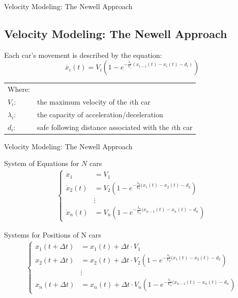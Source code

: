 \documentclass{beamer}
\begin{document}
\begin{frame}{Velocity Modeling: The Newell Approach}
\subsection{Velocity Modeling: The Newell Approach}
\begin{center}
    Each car's movement is described by the equation:
    \[
\boxed{\dot{x_i}(t) = V_i(1 - e^{-\frac{\lambda_i}{V_i}(x_{i-1}(t) - x_i(t) - d_i)})}
\]
\end{center}

\vspace{5mm}

\begin{center}
    \begin{tabular}{l l}
    Where:\\
        \(V_i\): & the maximum velocity of the \(i\)th car \\
        \(\lambda_i\): & the capacity of acceleration/deceleration \\
        \(d_i\): & safe following distance associated with the \(i\)th car \\
    \end{tabular}
\end{center}
\end{frame}
\begin{frame}{Velocity Modeling: The Newell Approach}
		\vspace{-0.3cm}
    	\begin{block}{System of Equations for $N$ cars}
    	\begin{align*}
    		\left\{
    		\begin{array}{ll}
    			\dot{x}_1 &= V_1 \\
    			\dot{x}_2(t) &= V_2(1-e^{-\frac{\lambda_2}{V_2}(x_{1}(t) - x_2(t) - d_2}) \\
    			&\vdots \\
    			\dot{x}_n(t) &= V_n(1-e^{-\frac{\lambda_n}{V_n}(x_{n-1}(t) - x_n(t) - d_n})
    		\end{array}
    		\right.
    	\end{align*}
    \end{block}
    \vspace{-0.3cm}
    \begin{block}{Systems for Positions of N cars}
    	\begin{align*}
    		\left\{
    		\begin{array}{ll}
    			x_1(t + \Delta t) &= x_1(t) + \Delta t \cdot  V_1\\
    			x_2(t + \Delta t) &= x_2(t) + \Delta t \cdot V_2(1-e^{-\frac{\lambda_2}{V_2}(x_{1}(t) - x_2(t) - d_2}) \\
    			&\vdots \\
    			x_n(t + \Delta t) &= x_n(t) + \Delta t \cdot V_n(1-e^{-\frac{\lambda_n}{V_n}(x_{n-1}(t) - x_n(t) - d_n})
    		\end{array}
    		\right.
    	\end{align*}
    \end{block}
\end{frame}
\end{document}
